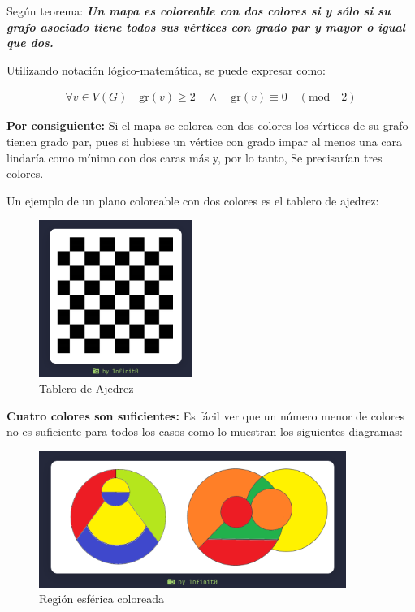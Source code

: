 \documentclass[11pt, a4paper]{article}
\begin{document}
  Según teorema: \textit{\textbf{Un mapa es coloreable con dos colores si y sólo si su grafo asociado 
  tiene todos sus vértices con grado par y mayor o igual que dos. }}

  Utilizando notación lógico-matemática, se puede expresar como:

  \begin{align*}
    \forall v \in V(G) \quad \text{gr}(v) \geq 2 \quad \land \quad \text{gr}(v) \equiv 0 \quad (\text{mod} \quad 2)
  \end{align*}

  \newpage

  \textbf{Por consiguiente:} Si el mapa se colorea con dos colores los vértices de su grafo tienen grado par, pues 
  si hubiese un vértice con grado impar al menos una cara lindaría como mínimo con 
  dos caras más y, por lo tanto, Se precisarían tres colores. 

  Un ejemplo de un plano coloreable con dos colores es el tablero de ajedrez:

  \begin{figure}[H]
    \centering
    \includegraphics[width=5cm]{./assets/tablero_ajedrez.png}
    \caption{Tablero de Ajedrez}
    \label{fig:tablero-ajedrez}
  \end{figure}

  \textbf{Cuatro colores son suficientes:} Es fácil ver que un número menor de colores no es suficiente para todos los casos como lo muestran los siguientes diagramas:

  \begin{figure}[H]
    \centering
    \includegraphics[width=10cm]{./assets/esfera_mapa.png}
    \caption{Región esférica coloreada}
    \label{fig:esfera-mapa}
  \end{figure}
  
\end{document}
